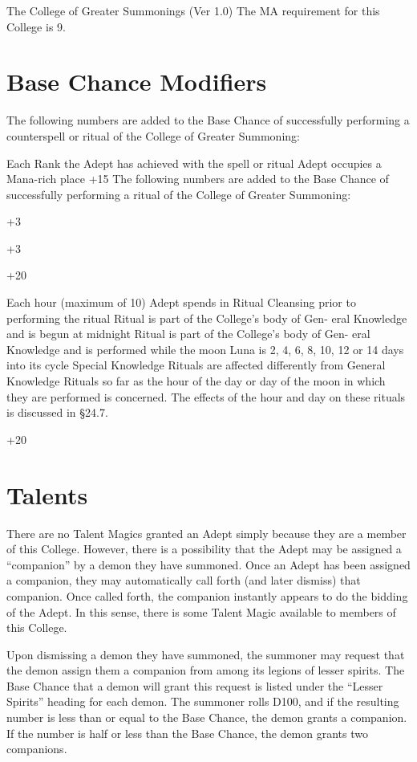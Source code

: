 \begin{Chapter}{The College of Greater Summonings (Ver 1.0)}
The MA requirement for this College is 9. 

\section{Base Chance Modifiers}

The  following  numbers  are  added  to  the  Base 
Chance  of  successfully  performing  a  counterspell 
or ritual of the College of Greater Summoning: 

Each Rank the Adept has achieved with the 
spell or ritual 
Adept occupies a Mana-rich place 
+15 
The  following  numbers  are  added  to  the  Base 
Chance  of  successfully  performing  a  ritual  of  the 
College of Greater Summoning: 

+3 

+3 

+20 

Each hour (maximum of 10) Adept spends in 
Ritual Cleansing prior to performing the 
ritual 
Ritual is part of the College’s body of Gen-
eral Knowledge and is begun at midnight 
Ritual is part of the College’s body of Gen-
eral Knowledge and is performed while the 
moon Luna is 2, 4, 6, 8, 10, 12 or 14 days 
into its cycle 
Special Knowledge Rituals are affected differently 
from General Knowledge Rituals so far as the hour 
of  the  day  or  day  of  the  moon  in  which  they  are 
performed  is  concerned.  The  effects  of  the  hour 
and day on these rituals is discussed in §24.7. 

+20 

\section{Talents}

There are no Talent Magics granted an Adept simply because they are a
member of this College.  However, there is a possibility that the
Adept may be assigned a “companion” by a demon they have summoned.
Once an Adept has been assigned a companion, they may automatically
call forth (and later dismiss) that companion.  Once called forth, the
companion instantly appears to do the bidding of the Adept.  In this
sense, there is some Talent Magic available to members of this
College.

Upon dismissing a demon they have summoned, the summoner may request
that the demon assign them a companion from among its legions of
lesser spirits.  The Base Chance that a demon will grant this request
is listed under the “Lesser Spirits” heading for each demon.  The
summoner rolls D100, and if the resulting number is less than or equal
to the Base Chance, the demon grants a companion.  If the number is
half or less than the Base Chance, the demon grants two companions.


\end{Chapter}
